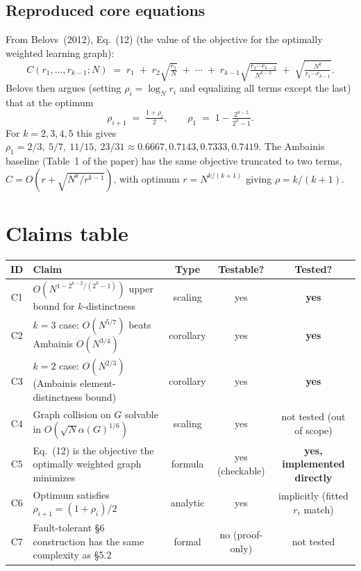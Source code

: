 \documentclass[11pt]{article}
\newcommand{\Ord}[1]{O\!\left(#1\right)}
\begin{document}
\subsection*{Reproduced core equations}
From Belovs~(2012), Eq.~(12) (the value of the objective for the
optimally weighted learning graph):
\begin{equation}\label{eq:12}
C(r_1,\dots,r_{k-1}; N) \;=\;
r_1 \;+\; r_2\sqrt{\tfrac{r_1}{N}} \;+\; \cdots \;+\;
r_{k-1}\sqrt{\tfrac{r_1\cdots r_{k-2}}{N^{k-2}}} \;+\;
\sqrt{\tfrac{N^k}{r_1\cdots r_{k-1}}}.
\end{equation}
Belovs then argues (setting $\rho_i = \log_N r_i$ and equalizing all
terms except the last) that at the optimum
\[
   \rho_{i+1} \;=\; \tfrac{1+\rho_i}{2},
   \qquad
   \rho_1 \;=\; 1 - \tfrac{2^{k-2}}{2^k-1}.
\]
For $k=2,3,4,5$ this gives
$\rho_1 = 2/3,\ 5/7,\ 11/15,\ 23/31 \approx 0.6667, 0.7143, 0.7333, 0.7419$.
The Ambainis baseline (Table~1 of the paper) has the same objective
truncated to two terms, $C = \Ord{r + \sqrt{N^k/r^{k-1}}}$, with optimum
$r = N^{k/(k+1)}$ giving $\rho = k/(k+1)$.

\section{Claims table}
\begin{tabular}{clccc}
\toprule
ID & Claim & Type & Testable? & Tested? \\
\midrule
C1 & $\Ord{N^{1-2^{k-2}/(2^k-1)}}$ upper bound for $k$-distinctness &
   scaling  & yes & \textbf{yes} \\
C2 & $k=3$ case: $\Ord{N^{5/7}}$ beats Ambainis $\Ord{N^{3/4}}$ &
   corollary & yes & \textbf{yes} \\
C3 & $k=2$ case: $\Ord{N^{2/3}}$ (Ambainis element-distinctness bound) &
   corollary & yes & \textbf{yes} \\
C4 & Graph collision on $G$ solvable in $\Ord{\sqrt{N}\alpha(G)^{1/6}}$ &
   scaling & yes & not tested (out of scope) \\
C5 & Eq.~(12) is the objective the optimally weighted graph minimizes &
   formula & yes (checkable) & \textbf{yes, implemented directly} \\
C6 & Optimum satisfies $\rho_{i+1}=(1+\rho_i)/2$ &
   analytic & yes & implicitly (fitted $r_i$ match) \\
C7 & Fault-tolerant §6 construction has the same complexity as §5.2 &
   formal & no (proof-only) & not tested \\
\bottomrule
\end{tabular}
\end{document}
